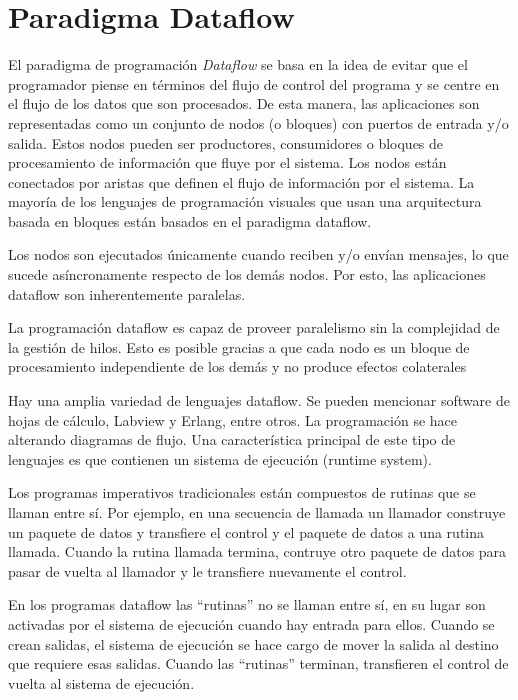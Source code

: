 \section{Paradigma Dataflow}

El paradigma de programación \textit{Dataflow} se basa en la idea de evitar que
el programador piense en términos del flujo de control del programa y se centre
en el flujo de los datos que son procesados.
De esta manera, las aplicaciones son representadas como un conjunto de nodos (o
bloques) con puertos de entrada y/o salida. Estos nodos pueden ser productores,
consumidores o bloques de procesamiento de información que fluye por el sistema. Los nodos
están conectados por aristas que definen el flujo de información por el
sistema. La mayoría de los lenguajes de programación visuales que usan una
arquitectura basada en bloques están basados en el paradigma dataflow.
\cite{DataflowTiagoSousa}

Los nodos son ejecutados únicamente cuando reciben y/o envían mensajes, lo que
sucede asíncronamente respecto de los demás nodos. Por esto, las aplicaciones
dataflow son inherentemente paralelas.\cite{DataflowRichardHarter}

La programación dataflow es capaz de proveer paralelismo sin la complejidad de
la gestión de hilos. Esto es posible gracias a que cada nodo es un bloque de
procesamiento independiente de los demás y no produce efectos colaterales
\cite{DataflowTiagoSousa}

Hay una amplia variedad de lenguajes dataflow. Se pueden mencionar
software de hojas de cálculo, Labview y Erlang, entre otros. La programación se
hace alterando diagramas de flujo. Una característica principal de este tipo de
lenguajes es que contienen un sistema de ejecución (runtime
system).\cite{DataflowRichardHarter}

Los programas imperativos tradicionales están compuestos de rutinas que se
llaman entre sí. Por ejemplo, en una secuencia de llamada un llamador
construye un paquete de datos y transfiere el control y el paquete de datos a
una rutina llamada. Cuando la rutina llamada termina, contruye otro paquete de
datos para pasar de vuelta al llamador y le transfiere nuevamente el control.

En los programas dataflow las “rutinas” no se llaman entre sí, en su lugar son
activadas por el sistema de ejecución cuando hay entrada para ellos. Cuando se
crean salidas, el sistema de ejecución se hace cargo de mover la salida al
destino que requiere esas salidas. Cuando las “rutinas” terminan, transfieren el
control de vuelta al sistema de ejecución.

